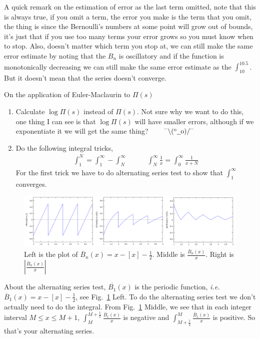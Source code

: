 \documentclass[aps,preprint,preprintnumbers,nofootinbib,showpacs,prd]{revtex4-1}
\newcommand{\ie}{{\it i.e.} }
\newcommand{\nbea}{\begin{eqnarray*}}
\newcommand{\neea}{\end{eqnarray*}}
\newcommand{\dunno}{$ {}^{\mbox {--}}\backslash(^{\rm o}{}\underline{\hspace{0.2cm}}{\rm o})/^{\mbox {--}}$}
\begin{document}
%
A quick remark on the estimation of error as the last term omitted, note that this is always true, if you omit a term, the error you make is the term that you omit, the thing is since the Bernoulli's numbers at some point will grow out of bounds, it's just that if you use too many terms your error grows so you must know when to stop. Also, doesn't matter which term you stop at, we can still make the same error estimate by noting that the $B_n$ is oscillatory and if the function is monotonically decreasing we can still make the same error estimate as the $\int_{10}^{10.5}$. But it doesn't mean that the series doesn't converge.



On the application of Euler-Maclaurin to $\Pi(s)$
%
\begin{enumerate}
\item Calculate $\log \Pi(s)$ instead of $\Pi(s)$. Not sure why we want to do this, one thing I can see is that $\log \Pi(s)$ will have smaller errors, although if we exponentiate it we will get the same thing? ~~~ \dunno
\item Do the following integral tricks, 
%
\nbea
\int_1^N = \int_1^\infty - \int_N^\infty ~~~~~~~~~~~~~ \int_N^\infty \frac{1}{x} = \int_0^\infty \frac{1}{x + N}
\neea
%
For the first trick we have to do alternating series test to show that $\int_1^\infty$ converges.
\end{enumerate}
%
%
\begin{figure}
\centering
  \includegraphics[width=1.00\linewidth]{B_over_x.png}
  \caption{Left is the plot of $\overline{B}_n(x) = x - [x]  -\frac{1}{2}$. Middle is $\frac{\overline{B}_n(x)}{x}$. Right is $\left|\frac{\overline{B}_n(x)}{x}\right|$}
\label{fig:B_over_x}
\end{figure}
%
About the alternating series test, $\overline{B_1}(x)$ is the periodic function, \ie $\overline{B}_1(x) = x - [x] - \frac{1}{2}$, see Fig.~\ref{fig:B_over_x} Left. To do the alternating series test we don't actually need to do the integral. From Fig.~\ref{fig:B_over_x} Middle, we see that in each integer interval $M \le x \le M+1$, $\int_M^{M+\frac{1}{2}} \frac{\overline{B}_1(x)}{x}$ is negative and $\int_{M+\frac{1}{2}}^M \frac{\overline{B}_1(x)}{x}$ is positive. So that's your alternating series.
\end{document}

